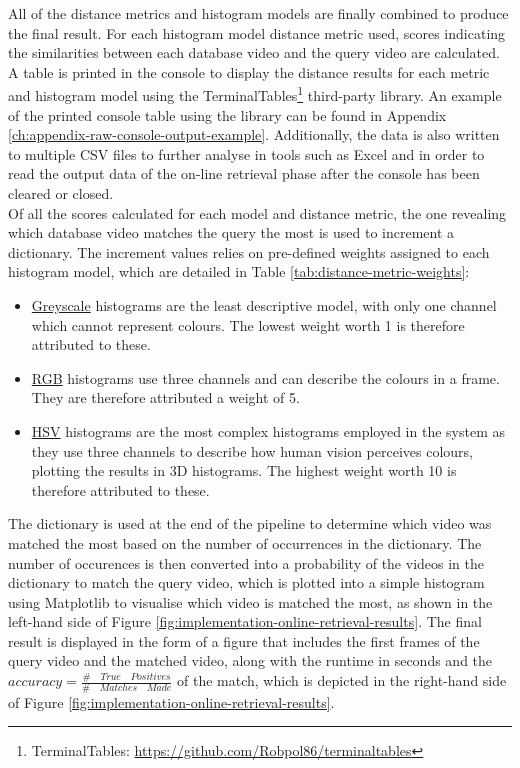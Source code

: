 All of the distance metrics and histogram models are finally combined to produce the final result. For each histogram model distance metric used, scores indicating the similarities between each database video and the query video are calculated. A table is printed in the console to display the distance results for each metric and histogram model using the TerminalTables\footnote{TerminalTables: \url{https://github.com/Robpol86/terminaltables}} third-party library. An example of the printed console table using the library can be found in Appendix \ref{ch:appendix-raw-console-output-example}. Additionally, the data is also written to multiple CSV files to further analyse in tools such as Excel and in order to read the output data of the on-line retrieval phase after the console has been cleared or closed.\\

Of all the scores calculated for each model and distance metric, the one revealing which database video matches the query the most is used to increment a dictionary. The increment values relies on pre-defined weights assigned to each histogram model, which are detailed in Table \ref{tab:distance-metric-weights}:

\begin{itemize}
    \item \underline{Greyscale} histograms are the least descriptive model, with only one channel which cannot represent colours. The lowest weight worth 1 is therefore attributed to these.
    \item \underline{RGB} histograms use three channels and can describe the colours in a frame. They are therefore attributed a weight of 5.
    \item \underline{HSV} histograms are the most complex histograms employed in the system as they use three channels to describe how human vision perceives colours, plotting the results in 3D histograms. The highest weight worth 10 is therefore attributed to these.
\end{itemize}



The dictionary is used at the end of the pipeline to determine which video was matched the most based on the number of occurrences in the dictionary. The number of occurences is then converted into a probability of the videos in the dictionary to match the query video, which is plotted into a simple histogram using Matplotlib to visualise which video is matched the most, as shown in the left-hand side of Figure \ref{fig:implementation-online-retrieval-results}. The final result is displayed in the form of a figure that includes the first frames of the query video and the matched video, along with the runtime in seconds and the $accuracy = \frac{\# \quad True \quad Positives}{\# \quad Matches \quad Made}$ of the match, which is depicted in the right-hand side of Figure \ref{fig:implementation-online-retrieval-results}.\\


